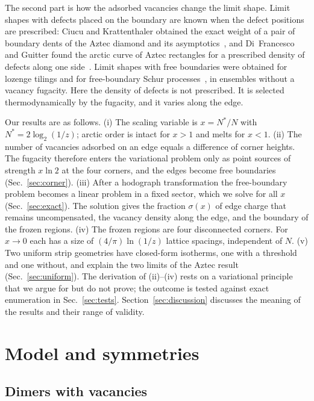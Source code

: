 \documentclass[reprint,aps,pre,superscriptaddress,longbibliography,floatfix,amsmath,amssymb]{revtex4-2}
\newcommand{\Nst}{N^{*}}                 %
\newcommand{\sig}{\sigma}                %
\begin{document}
The second part is how the adsorbed vacancies change the limit shape. Limit shapes with defects placed on the boundary are known when the defect positions are prescribed: Ciucu and Krattenthaler obtained the exact weight of a pair of boundary dents of the Aztec diamond and its asymptotics~\cite{ciucu2023}, and Di~Francesco and Guitter found the arctic curve of Aztec rectangles for a prescribed density of defects along one side~\cite{difrancesco2019}. Limit shapes with free boundaries were obtained for lozenge tilings and for free-boundary Schur processes~\cite{difrancesco2012,betea2018}, in ensembles without a vacancy fugacity. Here the density of defects is not prescribed. It is selected thermodynamically by the fugacity, and it varies along the edge.

Our results are as follows. (i) The scaling variable is $x=\Nst/N$ with $\Nst=2\log_2(1/z)$; arctic order is intact for $x>1$ and melts for $x<1$. (ii) The number of vacancies adsorbed on an edge equals a difference of corner heights. The fugacity therefore enters the variational problem only as point sources of strength $x\ln 2$ at the four corners, and the edges become free boundaries (Sec.~\ref{sec:corner}). (iii) After a hodograph transformation the free-boundary problem becomes a linear problem in a fixed sector, which we solve for all $x$ (Sec.~\ref{sec:exact}). The solution gives the fraction $\sig(x)$ of edge charge that remains uncompensated, the vacancy density along the edge, and the boundary of the frozen regions. (iv) The frozen regions are four disconnected corners. For $x\to 0$ each has a size of $(4/\pi)\ln(1/z)$ lattice spacings, independent of $N$. (v) Two uniform strip geometries have closed-form isotherms, one with a threshold and one without, and explain the two limits of the Aztec result (Sec.~\ref{sec:uniform}). The derivation of (ii)--(iv) rests on a variational principle that we argue for but do not prove; the outcome is tested against exact enumeration in Sec.~\ref{sec:tests}. Section~\ref{sec:discussion} discusses the meaning of the results and their range of validity.

\section{Model and symmetries}\label{sec:model}

\subsection{Dimers with vacancies}
\end{document}
